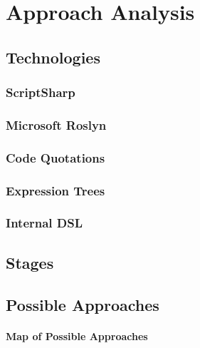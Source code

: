 \chapter{Approach Analysis}

\section{Technologies}
	\subsection{ScriptSharp}
	\subsection{Microsoft Roslyn} %
	\label{ssub:microsoft_roslyn}
	

	\subsection{Code Quotations} %
	\label{ssub:code_quotations}
	

	\subsection{Expression Trees} %
	\label{ssub:expression_trees}
	

	\subsection{Internal DSL} %
	\label{ssub:internal_dsl}
	

\section{Stages} %
\label{sec:stages}


\section{Possible Approaches} %
\label{sec:possible_approaches}

	\subsubsection{Map of Possible Approaches} %
	\label{ssub:map_of_possible_approaches}
	
